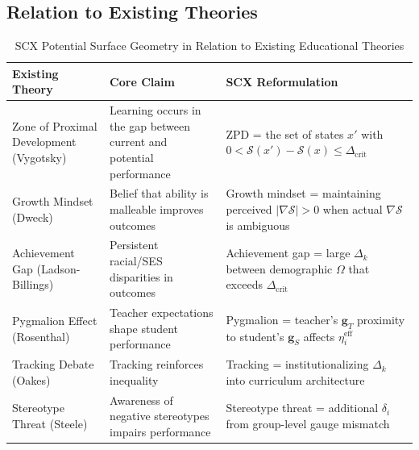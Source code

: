 \documentclass[11pt,a4paper]{article}
\newcommand{\cS}{\mathcal{S}}
\newcommand{\gradS}{\nabla\mathcal{S}}
\begin{document}
\subsection{Relation to Existing Theories}
\begin{table}[h]
\centering
\caption{SCX Potential Surface Geometry in Relation to Existing Educational Theories}
\label{tab:relation}
\begin{tabular}{p{3.5cm} p{5.5cm} p{5.5cm}}
\toprule
\textbf{Existing Theory} & \textbf{Core Claim} & \textbf{SCX Reformulation} \\
\midrule
Zone of Proximal Development (Vygotsky) & Learning occurs in the gap between current and potential performance & ZPD = the set of states $x'$ with $0 < \cS(x') - \cS(x) \leq \Delta_{\text{crit}}$ \\
\addlinespace
Growth Mindset (Dweck) & Belief that ability is malleable improves outcomes & Growth mindset = maintaining perceived $|\gradS| > 0$ when actual $\gradS$ is ambiguous \\
\addlinespace
Achievement Gap (Ladson-Billings) & Persistent racial/SES disparities in outcomes & Achievement gap = large $\Delta_k$ between demographic $\Omega$ that exceeds $\Delta_{\text{crit}}$ \\
\addlinespace
Pygmalion Effect (Rosenthal) & Teacher expectations shape student performance & Pygmalion = teacher's $\mathbf{g}_T$ proximity to student's $\mathbf{g}_S$ affects $\eta_i^{\text{eff}}$ \\
\addlinespace
Tracking Debate (Oakes) & Tracking reinforces inequality & Tracking = institutionalizing $\Delta_k$ into curriculum architecture \\
\addlinespace
Stereotype Threat (Steele) & Awareness of negative stereotypes impairs performance & Stereotype threat = additional $\delta_i$ from group-level gauge mismatch \\
\bottomrule
\end{tabular}
\end{table}
\end{document}
